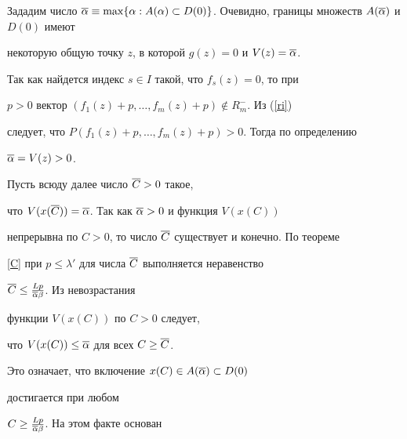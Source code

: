 Зададим число $\o\alpha\equiv\max\{\alpha: A(\alpha)\subset


D(0)\}$. Очевидно, границы множеств $A(\o\alpha)$ и $D(0)$ имеют


некоторую общую точку $z$, в которой $g(z)=0$ и $V(z)=\overline\alpha$.


Так как найдется индекс $s\in I$ такой, что $f_s(z)=0$, то при


$p>0$ вектор $(f_1(z)+p,\dotsc,f_m(z)+p)\notin R_m^-$. Из (\ref{ri})


следует, что $P(f_1(z)+p,\dotsc,f_m(z)+p)>0$. Тогда по определению


$\overline\alpha=V(z)>0$.





Пусть всюду далее число $\overline C>0$ такое, 


что $V(x(\overline C))=\overline\alpha$. Так как $\overline\alpha>0$ и функция $V(x(C))$ 


непрерывна по $C>0$, то число $\overline C$ существует и конечно. По теореме


\ref{C} при $p\leq \lambda'$ для числа $\overline C$ выполняется неравенство 


$\overline C\leq\frac{Lp}{\overline\alpha\beta}$. Из невозрастания 


функции $V(x(C))$ по $C>0$ следует, 


что $V(x(C))\leq\overline\alpha$ для всех $C\geq\overline C$.


Это означает, что включение $x(C)\in A(\overline\alpha)\subset D(0)$ 


достигается при любом


$C\geq\frac{Lp}{\overline\alpha\beta}$. На этом факте основан





